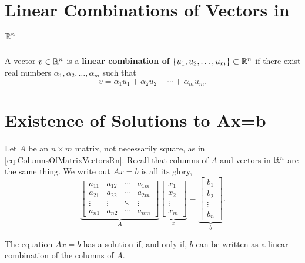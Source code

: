 \documentclass[letterpaper]{book}
\begin{document}
\section{Linear Combinations of Vectors in $\mathbb R^n$}

\begin{tcolorbox}[title=\textbf{Linear Combination}]
A vector $v\in \mathbb R^n$ is a \textbf{linear combination of} $\{u_1, u_2, \ldots, u_m\} \subset \mathbb R^n$ if there exist real numbers $\alpha_1, \alpha_2, \ldots, \alpha_m$ such that
\begin{equation}
    \label{eq:DefLinearCombinationRn}
    v = \alpha_1 u_1 + \alpha_2 u_2 + \cdots + \alpha_m u_m.
\end{equation}

\end{tcolorbox}

\section{Existence of Solutions to Ax=b}
\label{sec:UniquenessSolutions}

Let $A$ be an $n \times m$ matrix, not necessarily square, as in \eqref{eq:ColumnsOfMatrixVectorsRn}. Recall that columns of $A$ and vectors in $\mathbb R^n$ are the same thing. We write out $Ax=b$ is all its glory, 
\begin{equation}
\label{eq:ExistenceSolutionsNonsquare}    
 \underbrace{\left[\begin{array}{cccc} a_{11}& a_{12}& \cdots & a_{1m} \\
 a_{21}& a_{22}& \cdots & a_{2m}  \\
 \vdots & \vdots&  \ddots & \vdots \\
 a_{n1}& a_{n2}& \cdots & a_{nm} 
 \end{array}\right] }_{A} \underbrace{\left[ \begin{array}{c} x_1 \\ x_2 \\
\vdots \\ x_m   \end{array} \right]}_{x} = \underbrace{\left[ \begin{array}{c} b_1 \\ b_2 \\ \vdots \\ b_n  \end{array} \right]}_{b}.
\end{equation}

\vspace*{.5cm}
\begin{tcolorbox}[sharp corners, colback=green!30, colframe=green!80!blue, title=\textbf{\large Existence of Solutions}] 
The equation $Ax=b$ has a solution if, and only if, $b$ can be written as a linear combination of the columns of $A$.
\end{tcolorbox}
\end{document}
